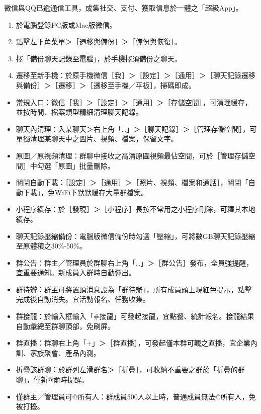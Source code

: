 
微信與QQ已逾通信工具，成集社交、支付、獲取信息於一體之「超級App」。


\begin{enumerate}
  \item 於電腦登錄PC版或Mac版微信。
  \item 點擊左下角菜單＞［遷移與備份］＞［備份與恢復］。
  \item 擇「備份聊天記錄至電腦」，於手機擇須備份之聊天。
  \item 遷移至新手機：於原手機微信［我］＞［設定］＞［通用］＞［聊天記錄遷移與備份］＞［遷移］＞［遷移至手機／平板］，掃碼即成。
\end{enumerate}


\begin{itemize}
  \item 常規入口：微信［我］＞［設定］＞［通用］＞［存儲空間］，可清理緩存，並按時間、檔案類型精細清理聊天記錄。
  \item 聊天內清理：入某聊天＞右上角「…」＞［聊天記錄］＞［管理存儲空間］，可單獨清理某聊天中之圖片、視頻、檔案，保留文字。
  \item 原圖／原視頻清理：群聊中接收之高清原圖視頻最佔空間，可於［管理存儲空間］中勾選「原圖」批量刪除。
  \item 關閉自動下載：［設定］＞［通用］＞［照片、視頻、檔案和通話］，關閉「自動下載」，免WiFi下默默緩存大量群檔案。
  \item 小程序緩存：於［發現］＞［小程序］長按不常用之小程序刪除，可釋其本地緩存。
  \item 聊天記錄壓縮備份：電腦版微信備份時勾選「壓縮」，可將數GB聊天記錄壓縮至原體積之30\%-50\%。
\end{itemize}


\begin{itemize}
  \item 群公告：群主／管理員於群聊右上角「…」＞［群公告］發布，全員強提醒，宜重要通知。新成員入群時自動彈出。
  \item 群待辦：群主可將置頂消息設為「群待辦」，所有成員頭上現紅色提示，點擊完成後自動消失。宜活動報名、任務收集。
  \item 群接龍：於輸入框輸入「\#接龍」可發起接龍，宜點餐、統計報名。接龍結果自動彙總至群聊頂部，免刷屏。
  \item 群直播：群聊右上角「+」＞［群直播］，可發起僅本群可觀之直播，宜企業內訓、家族聚會、產品內測。
  \item 折疊該群聊：於群列左滑群名＞［折疊］，可收納不重要之群於「折疊的群聊」，僅新@爾時提醒。
  \item 僅群主／管理員可@所有人：群成員500人以上時，普通成員無法@所有人，免被打擾。
\end{itemize}

